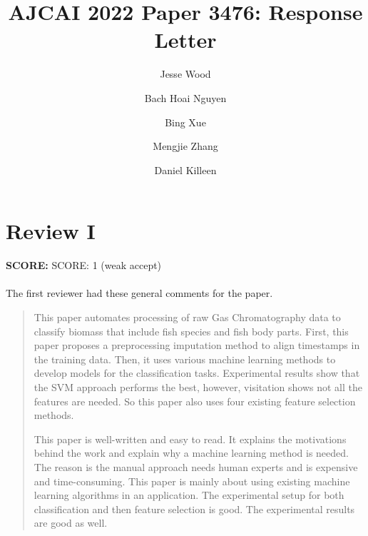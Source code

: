 \documentclass[runningheads]{llncs}
\begin{document}
%
\title{AJCAI 2022 Paper 3476: Response Letter}
%

\author{Jesse Wood \and
  Bach Hoai Nguyen \and
  Bing Xue \and 
  Mengjie Zhang \and 
  Daniel Killeen
}
%


%
\maketitle              %

\section{Review I}

\textbf{SCORE:} SCORE: 1 (weak accept)
\\\\
The first reviewer had these general comments for the paper. 

\begin{quote}
  This paper automates processing of raw Gas Chromatography data to classify biomass that include fish species and fish body parts. First, this paper proposes a preprocessing imputation method to align timestamps in the training data. Then, it uses various machine learning methods to develop models for the classification tasks. Experimental results show that the SVM approach performs the best, however, visitation shows not all the features are needed. So this paper also uses four existing feature selection methods.

  This paper is well-written and easy to read. It explains the motivations behind the work and explain why a machine learning method is needed. The reason is the manual approach needs human experts and is expensive and time-consuming. This paper is mainly about using existing machine learning algorithms in an application. The experimental setup for both classification and then feature selection is good. The experimental results are good as well.
\end{quote}
\end{document}
